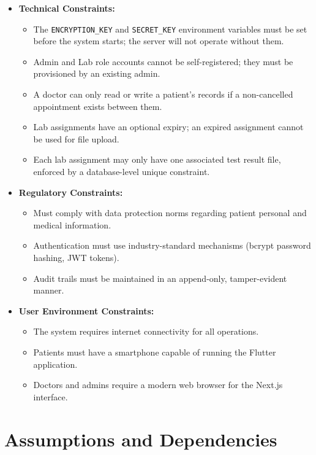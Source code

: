 \documentclass[a4paper,12pt]{report}
\begin{document}
\begin{itemize}
    \item \textbf{Technical Constraints:}
    \begin{itemize}
        \item The \texttt{ENCRYPTION\_KEY} and \texttt{SECRET\_KEY} environment variables must be set before the system starts; the server will not operate without them.
        \item Admin and Lab role accounts cannot be self-registered; they must be provisioned by an existing admin.
        \item A doctor can only read or write a patient's records if a non-cancelled appointment exists between them.
        \item Lab assignments have an optional expiry; an expired assignment cannot be used for file upload.
        \item Each lab assignment may only have one associated test result file, enforced by a database-level unique constraint.
    \end{itemize}
    \item \textbf{Regulatory Constraints:}
    \begin{itemize}
        \item Must comply with data protection norms regarding patient personal and medical information.
        \item Authentication must use industry-standard mechanisms (bcrypt password hashing, JWT tokens).
        \item Audit trails must be maintained in an append-only, tamper-evident manner.
    \end{itemize}
    \item \textbf{User Environment Constraints:}
    \begin{itemize}
        \item The system requires internet connectivity for all operations.
        \item Patients must have a smartphone capable of running the Flutter application.
        \item Doctors and admins require a modern web browser for the Next.js interface.
    \end{itemize}
\end{itemize}

\section{Assumptions and Dependencies}
\end{document}
